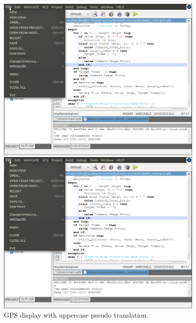 \begin{figure}
\begin{center}
\begin{latexonly}
    \includegraphics[angle=90,width=4in]{images/gps-upper.png}
\end{latexonly}
\begin{htmlonly}
    \includegraphics[width=4in]{images/gps-upper.png}
\end{htmlonly}
\end{center}
\caption{GPS display with uppercase pseudo translation.}
\label{fig:gps-upper}
\end{figure}

